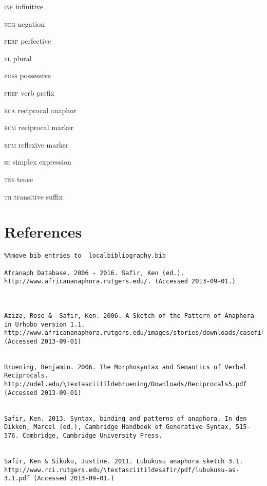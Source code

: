 \documentclass[output=paper]{langsci/langscibook}
\begin{document}
\textsc{inf}    infinitive

\textsc{neg}    negation

\textsc{perf}    perfective

\textsc{pl}    plural

\textsc{poss}    possessive

\textsc{pref}    verb prefix

\textsc{rca}    reciprocal anaphor

\textsc{rcm}    reciprocal marker

\textsc{rfm}    reflexive marker

\textsc{se}    simplex expression  

\textsc{tns}    tense

\textsc{tr}    transitive suffix

\section{References}


\begin{verbatim}%%move bib entries to  localbibliography.bib

Afranaph Database. 2006 - 2016. Safir, Ken (ed.). http://www.africananaphora.rutgers.edu/. (Accessed 2013-09-01.)



Aziza, Rose &  Safir, Ken. 2006. A Sketch of the Pattern of Anaphora in Urhobo version 1.1. http://www.africananaphora.rutgers.edu/images/stories/downloads/casefiles/UrhoboAS.pdfwww.africananaphora.rutgers.edu/images/stories/downloads/casefiles/UrhoboAS.pdf (Accessed 2013-09-01)


Bruening, Benjamin. 2006. The Morphosyntax and Semantics of Verbal Reciprocals. http://udel.edu/\textasciitildebruening/Downloads/Reciprocals5.pdf (Accessed 2013-09-01)


Safir, Ken. 2013. Syntax, binding and patterns of anaphora. In den Dikken, Marcel (ed.), Cambridge Handbook of Generative Syntax, 515-576. Cambridge, Cambridge University Press.


Safir, Ken & Sikuku, Justine. 2011. Lubukusu anaphora sketch 3.1. http://www.rci.rutgers.edu/\textasciitildesafir/pdf/lubukusu-as-3.1.pdf (Accessed 2013-09-01.)




\end{verbatim}
 

\printbibliography[heading=subbibliography,notkeyword=this]
\end{document}
